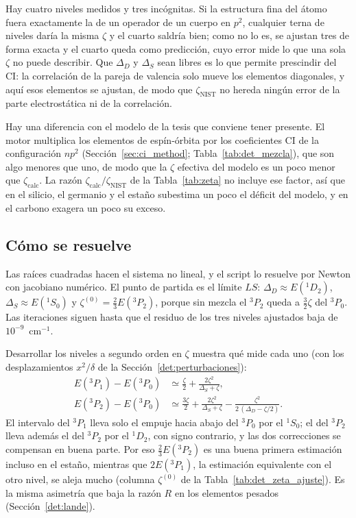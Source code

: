 \documentclass[11pt,a4paper]{article}
\begin{document}
Hay cuatro niveles medidos y tres incógnitas. Si la estructura fina del átomo fuera exactamente la
de un operador de un cuerpo en $p^2$, cualquier terna de niveles daría la misma $\zeta$ y el cuarto
saldría bien; como no lo es, se ajustan tres de forma exacta y el cuarto queda como predicción, cuyo
error mide lo que una sola $\zeta$ no puede describir. Que $\Delta_D$ y $\Delta_S$ sean libres es lo
que permite prescindir del CI: la correlación de la pareja de valencia solo mueve los elementos
diagonales, y aquí esos elementos se ajustan, de modo que $\zeta_{\text{NIST}}$ no hereda ningún
error de la parte electrostática ni de la correlación.

Hay una diferencia con el modelo de la tesis que conviene tener presente. El motor multiplica los
elementos de espín-órbita por los coeficientes CI de la configuración $np^2$
(Sección~\ref{sec:ci_method}; Tabla~\ref{tab:det_mezcla}), que son algo menores que uno, de modo
que la $\zeta$ efectiva del modelo es un poco menor que $\zeta_{\text{calc}}$. La razón
$\zeta_{\text{calc}}/\zeta_{\text{NIST}}$ de la Tabla~\ref{tab:zeta} no incluye ese factor, así
que en el silicio, el germanio y el estaño subestima un poco el déficit del modelo, y en el
carbono exagera un poco su exceso.

\subsection{Cómo se resuelve}

Las raíces cuadradas hacen el sistema no lineal, y el script lo resuelve por Newton con jacobiano
numérico. El punto de partida es el límite $LS$: $\Delta_D \approx E(^1D_2)$,
$\Delta_S \approx E(^1S_0)$ y $\zeta^{(0)} = \tfrac{2}{3}E(^3P_2)$, porque sin mezcla el
$^3P_2$ queda a $\tfrac{3}{2}\zeta$ del $^3P_0$. Las iteraciones siguen hasta que el residuo de los
tres niveles ajustados baja de $10^{-9}$~cm$^{-1}$.

Desarrollar los niveles a segundo orden en $\zeta$ muestra qué mide cada uno (con los
desplazamientos $x^2/\delta$ de la Sección~\ref{det:perturbaciones}):
\begin{align}
  E(^3P_1) - E(^3P_0) &\simeq \frac{\zeta}{2} + \frac{2\zeta^2}{\Delta_S + \zeta}, \\
  E(^3P_2) - E(^3P_0) &\simeq \frac{3\zeta}{2} + \frac{2\zeta^2}{\Delta_S + \zeta}
                        - \frac{\zeta^2}{2\,(\Delta_D - \zeta/2)} .
\end{align}
El intervalo del $^3P_1$ lleva solo el empuje hacia abajo del $^3P_0$ por el $^1S_0$; el del
$^3P_2$ lleva además el del $^3P_2$ por el $^1D_2$, con signo contrario, y las dos correcciones se
compensan en buena parte. Por eso $\tfrac{2}{3}E(^3P_2)$ es una buena primera estimación incluso
en el estaño, mientras que $2E(^3P_1)$, la estimación equivalente con el otro nivel, se aleja
mucho (columna $\zeta^{(0)}$ de la Tabla~\ref{tab:det_zeta_ajuste}). Es la misma asimetría que baja
la razón $R$ en los elementos pesados (Sección~\ref{det:lande}).
\end{document}

